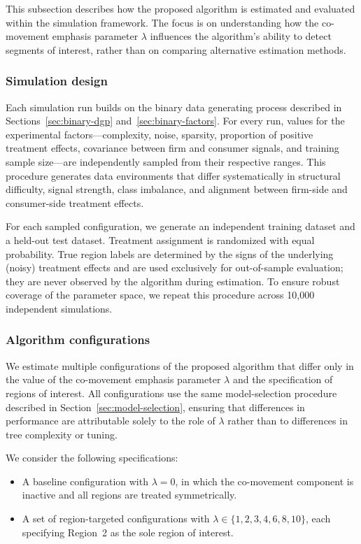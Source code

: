 \documentclass[11pt,letterpaper,english]{article}
\theoremstyle{definition}
\theoremstyle{definition}
\begin{document}
\begin{bibunit}
This subsection describes how the proposed algorithm is estimated and evaluated within the simulation framework. The focus is on understanding how the co-movement emphasis parameter $\lambda$ influences the algorithm’s ability to detect segments of interest, rather than on comparing alternative estimation methods.

\subsubsection{Simulation design}

Each simulation run builds on the binary data generating process described in Sections~\ref{sec:binary-dgp} and~\ref{sec:binary-factors}. For every run, values for the experimental factors—complexity, noise, sparsity, proportion of positive treatment effects, covariance between firm and consumer signals, and training sample size—are independently sampled from their respective ranges. This procedure generates data environments that differ systematically in structural difficulty, signal strength, class imbalance, and alignment between firm-side and consumer-side treatment effects.

For each sampled configuration, we generate an independent training dataset and a held-out test dataset. Treatment assignment is randomized with equal probability. True region labels are determined by the signs of the underlying (noisy) treatment effects and are used exclusively for out-of-sample evaluation; they are never observed by the algorithm during estimation. To ensure robust coverage of the parameter space, we repeat this procedure across 10{,}000 independent simulations.

\subsubsection{Algorithm configurations}

We estimate multiple configurations of the proposed algorithm that differ only in the value of the co-movement emphasis parameter $\lambda$ and the specification of regions of interest. All configurations use the same model-selection procedure described in Section~\ref{sec:model-selection}, ensuring that differences in performance are attributable solely to the role of $\lambda$ rather than to differences in tree complexity or tuning.

We consider the following specifications:
\begin{itemize}
    \item A baseline configuration with $\lambda = 0$, in which the co-movement component is inactive and all regions are treated symmetrically.
    \item A set of region-targeted configurations with $\lambda \in \{1, 2, 3, 4, 6, 8, 10\}$, each specifying Region~2 as the sole region of interest.
\end{itemize}


\end{bibunit}
\end{document}
